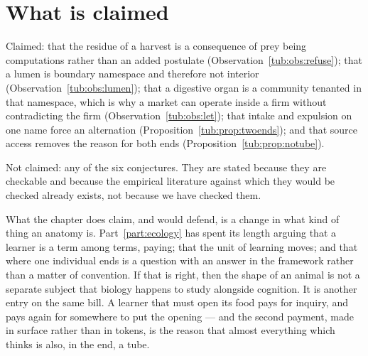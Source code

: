 \section{What is claimed}
\label{tub:sec:claimed}

Claimed: that the residue of a harvest is a consequence of prey being
computations rather than an added postulate
(Observation~\ref{tub:obs:refuse}); that a lumen is boundary namespace and
therefore not interior (Observation~\ref{tub:obs:lumen}); that a digestive organ
is a community tenanted in that namespace, which is why a market can operate
inside a firm without contradicting the firm (Observation~\ref{tub:obs:let});
that intake and expulsion on one name force an alternation
(Proposition~\ref{tub:prop:twoends}); and that source access removes the reason
for both ends (Proposition~\ref{tub:prop:notube}).

Not claimed: any of the six conjectures. They are stated because they are
checkable and because the empirical literature against which they would be
checked already exists, not because we have checked them.

What the chapter does claim, and would defend, is a change in what kind of thing
an anatomy is. Part~\ref{part:ecology} has spent its length arguing that a
learner is a term among terms, paying; that the unit of learning moves; and that
where one individual ends is a question with an answer in the framework rather
than a matter of convention. If that is right, then the shape of an animal is not
a separate subject that biology happens to study alongside cognition. It is
another entry on the same bill. A learner that must open its food pays for
inquiry, and pays again for somewhere to put the opening --- and the second
payment, made in surface rather than in tokens, is the reason that almost
everything which thinks is also, in the end, a tube.
